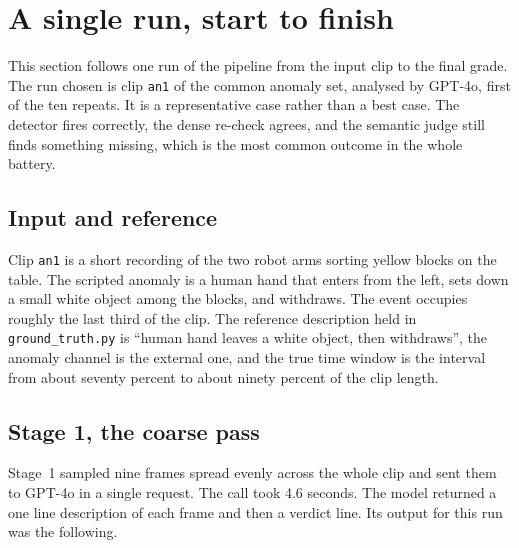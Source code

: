 
\section{A single run, start to finish}
\label{sec:worked-example}

This section follows one run of the pipeline from the input clip to the
final grade. The run chosen is clip \texttt{an1} of the common anomaly
set, analysed by GPT-4o, first of the ten repeats. It is a representative
case rather than a best case. The detector fires correctly, the dense
re-check agrees, and the semantic judge still finds something missing,
which is the most common outcome in the whole battery.

\subsection{Input and reference}

Clip \texttt{an1} is a short recording of the two robot arms sorting
yellow blocks on the table. The scripted anomaly is a human hand that
enters from the left, sets down a small white object among the blocks, and
withdraws. The event occupies roughly the last third of the clip. The
reference description held in \texttt{ground\_truth.py} is ``human hand
leaves a white object, then withdraws'', the anomaly channel is the
external one, and the true time window is the interval from about seventy
percent to about ninety percent of the clip length.

\subsection{Stage 1, the coarse pass}

Stage~1 sampled nine frames spread evenly across the whole clip and sent
them to GPT-4o in a single request. The call took 4.6 seconds. The model
returned a one line description of each frame and then a verdict line. Its
output for this run was the following.

